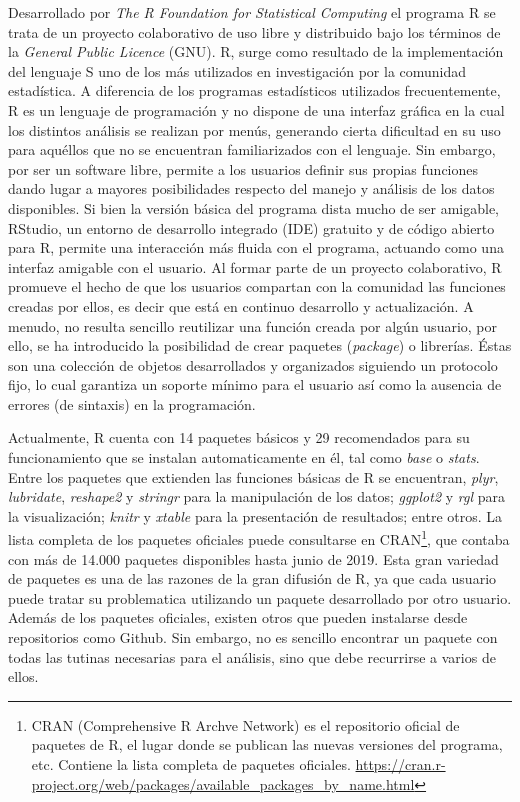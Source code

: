 Desarrollado por \emph{The R Foundation for Statistical Computing} el programa R se trata de un proyecto colaborativo de uso libre y distribuido bajo los términos de la \emph{General Public Licence} (GNU). R, surge como resultado de la implementación del lenguaje S uno de los más utilizados en investigación por la comunidad estadística. A diferencia de los programas estadísticos utilizados frecuentemente, R es un lenguaje de programación y no dispone de una interfaz gráfica en la cual los distintos análisis se realizan por menús, generando cierta dificultad en su uso para aquéllos que no se encuentran familiarizados con el lenguaje. Sin embargo,  por ser un software  libre,  permite a los usuarios definir sus propias funciones dando lugar a mayores posibilidades respecto del manejo y análisis de los datos disponibles. Si bien la versión básica del programa dista mucho de ser amigable, RStudio, un entorno de desarrollo integrado (IDE) gratuito y de código abierto para R, permite una interacción más fluida con el programa, actuando como una interfaz amigable con el usuario.  Al formar parte de un proyecto colaborativo, R promueve el hecho de que los usuarios compartan con la comunidad las funciones creadas por ellos, es decir que está en continuo desarrollo y actualización. A menudo, no resulta sencillo reutilizar una función creada por algún usuario, por ello, se ha introducido la posibilidad de crear paquetes (\emph{package}) o librerías. Éstas son una colección de objetos desarrollados y organizados siguiendo un protocolo fijo, lo cual garantiza un soporte mínimo para el usuario así como la ausencia de errores (de sintaxis) en la programación.

Actualmente, R cuenta con 14 paquetes básicos y 29 recomendados para su funcionamiento que se instalan automaticamente en él, tal como \emph{base} o \emph{stats}. Entre los paquetes que extienden las funciones básicas de R se encuentran, \emph{plyr}, \emph{lubridate}, \emph{reshape2} y \emph{stringr} para la manipulación de los datos; \emph{ggplot2} y \emph{rgl} para la visualización; \emph{knitr} y \emph{xtable} para la presentación de resultados; entre otros. La lista completa de los paquetes oficiales puede consultarse en CRAN\footnote{CRAN (Comprehensive R Archve Network) es el repositorio oficial de paquetes de R, el lugar donde se publican las nuevas versiones del programa, etc. Contiene la lista completa de paquetes oficiales. \url{https://cran.r-project.org/web/packages/available_packages_by_name.html}}, que contaba con más de 14.000 paquetes disponibles hasta junio de 2019. Esta gran variedad de paquetes es una de las razones de la gran difusión de R, ya que cada usuario puede tratar su problematica utilizando un paquete desarrollado por otro usuario. Además de los paquetes oficiales, existen otros que pueden instalarse desde repositorios como Github. Sin embargo, no es sencillo encontrar un paquete con todas las tutinas necesarias para el análisis, sino que debe recurrirse a varios de ellos. 

